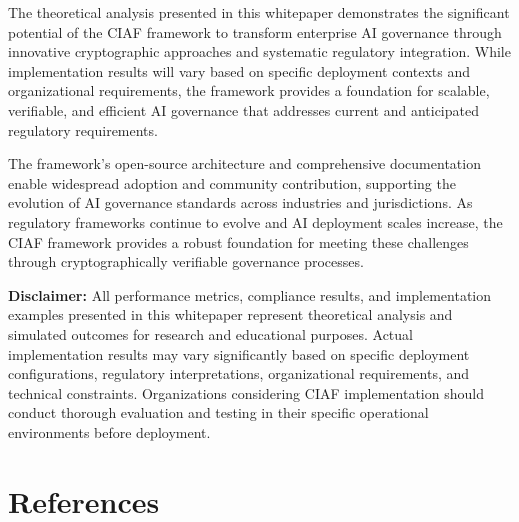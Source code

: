 \documentclass[12pt,a4paper]{article}
\begin{document}
The theoretical analysis presented in this whitepaper demonstrates the significant potential of the CIAF framework to transform enterprise AI governance through innovative cryptographic approaches and systematic regulatory integration. While implementation results will vary based on specific deployment contexts and organizational requirements, the framework provides a foundation for scalable, verifiable, and efficient AI governance that addresses current and anticipated regulatory requirements.

The framework's open-source architecture and comprehensive documentation enable widespread adoption and community contribution, supporting the evolution of AI governance standards across industries and jurisdictions. As regulatory frameworks continue to evolve and AI deployment scales increase, the CIAF framework provides a robust foundation for meeting these challenges through cryptographically verifiable governance processes.

\textbf{Disclaimer:} All performance metrics, compliance results, and implementation examples presented in this whitepaper represent theoretical analysis and simulated outcomes for research and educational purposes. Actual implementation results may vary significantly based on specific deployment configurations, regulatory interpretations, organizational requirements, and technical constraints. Organizations considering CIAF implementation should conduct thorough evaluation and testing in their specific operational environments before deployment.

\newpage

\section*{References}
\end{document}
